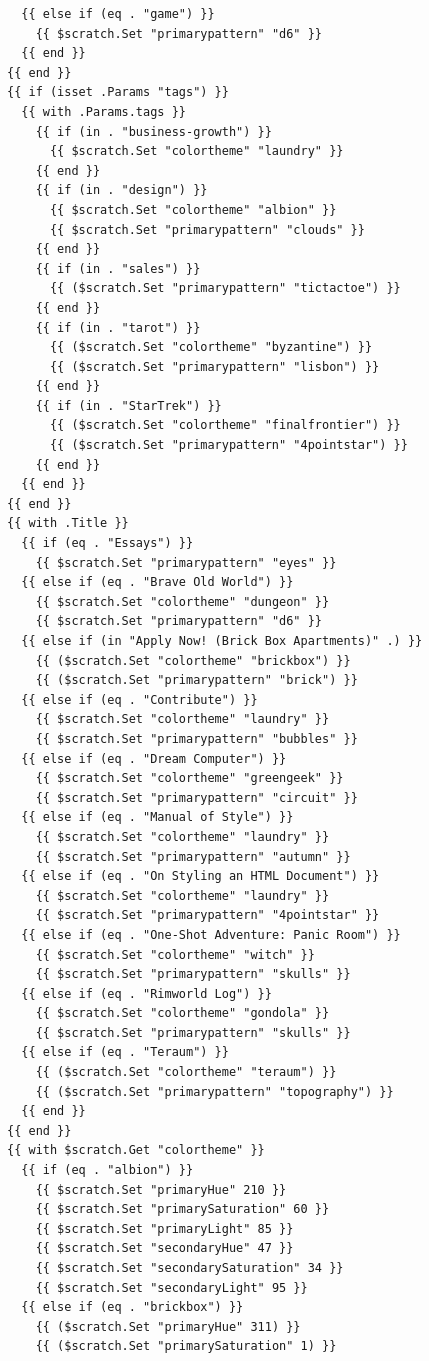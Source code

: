\documentclass[11pt]{article}
\begin{document}
\begin{enumerate}
\begin{verbatim}
  {{ else if (eq . "game") }}
    {{ $scratch.Set "primarypattern" "d6" }}
  {{ end }}
{{ end }}
{{ if (isset .Params "tags") }}
  {{ with .Params.tags }}
    {{ if (in . "business-growth") }}
      {{ $scratch.Set "colortheme" "laundry" }}
    {{ end }}
    {{ if (in . "design") }}
      {{ $scratch.Set "colortheme" "albion" }}
      {{ $scratch.Set "primarypattern" "clouds" }}
    {{ end }}
    {{ if (in . "sales") }}
      {{ ($scratch.Set "primarypattern" "tictactoe") }}
    {{ end }}
    {{ if (in . "tarot") }}
      {{ ($scratch.Set "colortheme" "byzantine") }}
      {{ ($scratch.Set "primarypattern" "lisbon") }}
    {{ end }}
    {{ if (in . "StarTrek") }}
      {{ ($scratch.Set "colortheme" "finalfrontier") }}
      {{ ($scratch.Set "primarypattern" "4pointstar") }}
    {{ end }}
  {{ end }}
{{ end }}
{{ with .Title }}
  {{ if (eq . "Essays") }}
    {{ $scratch.Set "primarypattern" "eyes" }}
  {{ else if (eq . "Brave Old World") }}
    {{ $scratch.Set "colortheme" "dungeon" }}
    {{ $scratch.Set "primarypattern" "d6" }}
  {{ else if (in "Apply Now! (Brick Box Apartments)" .) }}
    {{ ($scratch.Set "colortheme" "brickbox") }}
    {{ ($scratch.Set "primarypattern" "brick") }}
  {{ else if (eq . "Contribute") }}
    {{ $scratch.Set "colortheme" "laundry" }}
    {{ $scratch.Set "primarypattern" "bubbles" }}
  {{ else if (eq . "Dream Computer") }}
    {{ $scratch.Set "colortheme" "greengeek" }}
    {{ $scratch.Set "primarypattern" "circuit" }}
  {{ else if (eq . "Manual of Style") }}
    {{ $scratch.Set "colortheme" "laundry" }}
    {{ $scratch.Set "primarypattern" "autumn" }}
  {{ else if (eq . "On Styling an HTML Document") }}
    {{ $scratch.Set "colortheme" "laundry" }}
    {{ $scratch.Set "primarypattern" "4pointstar" }}
  {{ else if (eq . "One-Shot Adventure: Panic Room") }}
    {{ $scratch.Set "colortheme" "witch" }}
    {{ $scratch.Set "primarypattern" "skulls" }}
  {{ else if (eq . "Rimworld Log") }}
    {{ $scratch.Set "colortheme" "gondola" }}
    {{ $scratch.Set "primarypattern" "skulls" }}
  {{ else if (eq . "Teraum") }}
    {{ ($scratch.Set "colortheme" "teraum") }}
    {{ ($scratch.Set "primarypattern" "topography") }}
  {{ end }}
{{ end }}
{{ with $scratch.Get "colortheme" }}
  {{ if (eq . "albion") }}
    {{ $scratch.Set "primaryHue" 210 }}
    {{ $scratch.Set "primarySaturation" 60 }}
    {{ $scratch.Set "primaryLight" 85 }}
    {{ $scratch.Set "secondaryHue" 47 }}
    {{ $scratch.Set "secondarySaturation" 34 }}
    {{ $scratch.Set "secondaryLight" 95 }}
  {{ else if (eq . "brickbox") }}
    {{ ($scratch.Set "primaryHue" 311) }}
    {{ ($scratch.Set "primarySaturation" 1) }}

\end{verbatim}
\end{enumerate}
\end{document}
